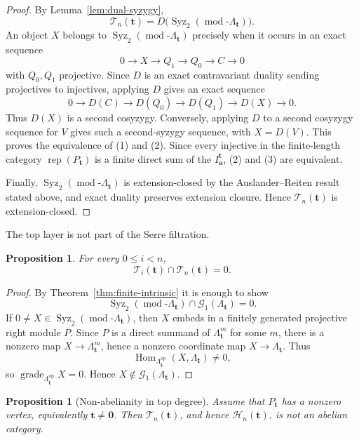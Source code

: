 \documentclass[12pt,reqno]{amsart}
\newtheorem{proposition}[theorem]{Proposition}
\theoremstyle{definition}
\theoremstyle{remark}
\newcommand{\Rep}{\operatorname{rep}}
\newcommand{\Hom}{\operatorname{Hom}}
\newcommand{\grade}{\operatorname{grade}}
\newcommand{\modcat}{\operatorname{mod}}
\begin{document}
\begin{proof}
By Lemma~\ref{lem:dual-syzygy},
\[
\mathcal T_n(\mathbf t)
=
D\bigl(\operatorname{Syz}_2(\modcat\text{-}\Lambda_{\mathbf t})\bigr).
\]
An object $X$ belongs to $\operatorname{Syz}_2(\modcat\text{-}\Lambda_{\mathbf t})$ precisely when it occurs in an exact sequence
\[
0\longrightarrow X\longrightarrow Q_1\longrightarrow Q_0
\longrightarrow C\longrightarrow0
\]
with $Q_0,Q_1$ projective.  Since $D$ is an exact contravariant duality sending projectives to injectives, applying $D$ gives an exact sequence
\[
0\longrightarrow D(C)\longrightarrow D(Q_0)\longrightarrow D(Q_1)
\longrightarrow D(X)\longrightarrow0.
\]
Thus $D(X)$ is a second cosyzygy.  Conversely, applying $D$ to a second
cosyzygy sequence for $V$ gives such a second-syzygy sequence, with
$X=D(V)$.  This proves the equivalence of (1) and (2).  Since every injective
in the finite-length category $\Rep(P_{\mathbf t})$ is a finite direct sum of
the $I^{\mathbf t}_{\mathbf a}$, (2) and (3) are equivalent.

Finally, $\operatorname{Syz}_2(\modcat\text{-}\Lambda_{\mathbf t})$ is extension-closed by the Auslander--Reiten result stated above, and exact duality preserves extension closure.  Hence $\mathcal T_n(\mathbf t)$ is extension-closed.
\end{proof}

The top layer is not part of the Serre filtration.

\begin{proposition}\label{prop:top-disjoint}
For every $0\le i<n$,
\[
\mathcal T_i(\mathbf t)\cap\mathcal T_n(\mathbf t)=0.
\]
\end{proposition}

\begin{proof}
By Theorem~\ref{thm:finite-intrinsic} it is enough to show
\[
\operatorname{Syz}_2(\modcat\text{-}\Lambda_{\mathbf t})
\cap
\mathcal G_1(\Lambda_{\mathbf t})=0.
\]
If $0\ne X\in\operatorname{Syz}_2(\modcat\text{-}\Lambda_{\mathbf t})$, then $X$ embeds in a finitely generated projective right module $P$.  Since $P$ is a direct summand of $\Lambda_{\mathbf t}^m$ for some $m$, there is a nonzero map $X\to\Lambda_{\mathbf t}^m$, hence a nonzero coordinate map $X\to\Lambda_{\mathbf t}$.  Thus
\[
\Hom_{\Lambda_{\mathbf t}^{\mathrm{op}}}(X,\Lambda_{\mathbf t})\ne0,
\]
so $\grade_{\Lambda_{\mathbf t}^{\mathrm{op}}}X=0$.  Hence $X\notin\mathcal G_1(\Lambda_{\mathbf t})$.
\end{proof}

\begin{proposition}[Non-abelianity in top degree]\label{prop:top-nonabelian}
Assume that $P_{\mathbf t}$ has a nonzero vertex, equivalently
$\mathbf t\ne\mathbf0$.  Then $\mathcal T_n(\mathbf t)$, and hence
$\mathcal H_n(\mathbf t)$, is not an abelian category.
\end{proposition}
\end{document}

